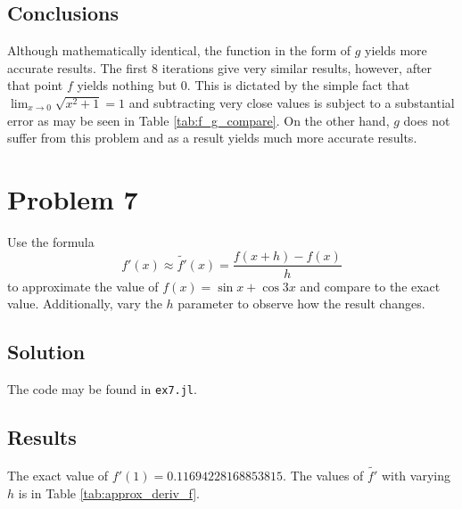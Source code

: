 \documentclass[12pt, a4paper]{article}
\newcommand{\code}[1]{\texttt{#1}}
\begin{document}
\subsection{Conclusions}
Although mathematically identical, the function in the form of $g$ yields more
accurate results. The first 8 iterations give very similar results, however,
after that point $f$ yields nothing but 0. This is dictated by the simple fact
that $\lim_{x \to 0} \sqrt{x^2 + 1} = 1$ and subtracting very close values is
subject to a substantial error as may be seen in Table \ref{tab:f_g_compare}. On
the other hand, $g$ does not suffer from this problem and as a result yields
much more accurate results.

\section{Problem 7}
Use the formula
$$
f'(x) \approx \widetilde{f'}(x) = \frac{f(x + h) - f(x)}{h}
$$
to approximate the value of $f(x) = \sin x + \cos 3x$ and compare to the exact
value. Additionally, vary the $h$ parameter to observe how the result changes.

\subsection{Solution}
The code may be found in \code{ex7.jl}.

\subsection{Results}
The exact value of $f'(1) = 0.11694228168853815$. The values of $\widetilde{f'}$
with varying $h$ is in Table \ref{tab:approx_deriv_f}.
\end{document}
